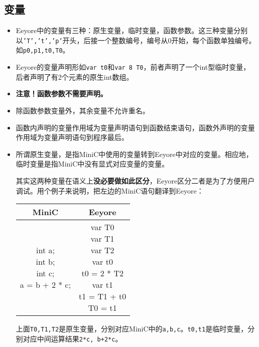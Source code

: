 \documentclass{ctexart}
\newenvironment{typewriterfont}{\ttfamily}{\par}
\begin{document}
\subsection{变量}
\begin{itemize}
\item 
Eeyore中的变量有三种：原生变量，临时变量，函数参数。这三种变量分别以\texttt{'T','t','p'}开头，后接一个整数编号，编号从0开始，每个函数单独编号。如\texttt{p0,p1,t0,T0}。

\item 
Eeyore的变量声明形如\texttt{var t0}和\texttt{var 8 T0}，前者声明了一个int型临时变量，后者声明了有2个元素的原生int数组。

\item
\textbf{注意！函数参数不需要声明。}

\item 
除函数参数变量外，其余变量不允许重名。

\item 
函数内声明的变量作用域为变量声明语句到函数结束语句，函数外声明的变量作用域为变量声明语句到程序最后。

\item 
所谓原生变量，是指MiniC中使用的变量转到Eeyore中对应的变量。相应地，临时变量是指MiniC中没有显式对应变量的变量。

\qquad 其实这两种变量在语义上\textbf{没必要做如此区分}，Eeyore区分二者是为了方便用户调试。用个例子来说明，把左边的MiniC语句翻译到Eeyore：
\begin{table}[H]
    \centering
    \small
    \begin{typewriterfont}
    \begin{tabular}{|c|c|}
        \hline
        MiniC & Eeyore \\
        \hline
        \makecell[l]{int a;\\ int b;\\ int c;\\a = b + 2 * c;} & \makecell[l]{var T0\\var T1\\var T2\\var t0\\t0 = 2 * T2\\var t1\\t1 = T1 + t0\\T0 = t1} \\
        \hline
    \end{tabular}
    \end{typewriterfont}
\end{table}

上面\texttt{T0,T1,T2}是原生变量，分别对应MiniC中的\texttt{a,b,c}。\texttt{t0,t1}是临时变量，分别对应中间运算结果\texttt{2*c, b+2*c}。

\end{itemize}
\end{document}
